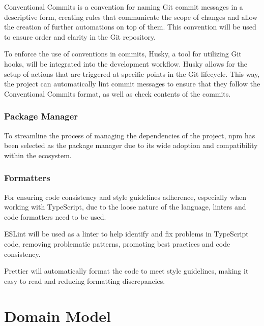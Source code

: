 Conventional Commits is a convention for naming Git commit messages in a descriptive form, creating rules that communicate the scope of changes and allow the creation of further automations on top of them. This convention will be used to ensure order and clarity in the Git repository.~\cite{ConventionalCommits}

To enforce the use of conventions in commits, Husky, a tool for utilizing Git hooks, will be integrated into the development workflow. Husky allows for the setup of actions that are triggered at specific points in the Git lifecycle. This way, the project can automatically lint commit messages to ensure that they follow the Conventional Commits format, as well as check contents of the commits.~\cite{Husky}

\subsubsection{Package Manager}

To streamline the process of managing the dependencies of the project, npm has been selected as the package manager due to its wide adoption and compatibility within the ecosystem. \cite{Abramowski2022}

\subsubsection{Formatters}

For ensuring code consistency and style guidelines adherence, especially when working with TypeScript, due to the loose nature of the language, linters and code formatters need to be used.

ESLint will be used as a linter to help identify and fix problems in TypeScript code, removing problematic patterns, promoting best practices and code consistency. \cite{Gupta2021}

Prettier will automatically format the code to meet style guidelines, making it easy to read and reducing formatting discrepancies. \cite{Wojtasinski2023}


\section{Domain Model} \label{section:domain-model}

